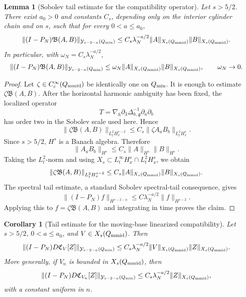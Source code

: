 \documentclass[11pt]{article}
\numberwithin{equation}{section}
\theoremstyle{plain}
\newtheorem{lemma}{Lemma}[section]
\newtheorem{corollary}{Corollary}[section]
\theoremstyle{definition}
\theoremstyle{remark}
\newcommand{\nabh}{\nabla_h}
\newcommand{\calB}{\mathfrak B}
\newcommand{\calC}{\mathfrak C}
\newcommand{\calY}{\mathcal Y}
\begin{document}
\begin{lemma}[Sobolev tail estimate for the compatibility operator]
\label{pIII:lem:sobolev-tail-compatibility}
Let \(s>5/2\).  There exist \(a_0>0\) and constants \(C_s\), depending only on the interior cylinder
chain and on \(s\), such that for every \(0<a\le a_0\),
\[
        \|(I-P_N)\calB(A,B)\|_{\calY_{s-2-a}(Q_{\rm min})}
        \le
        C_s\lambda_N^{-a/2}
        \|A\|_{X_s(Q_{\rm mmid})}\|B\|_{X_s(Q_{\rm mmid})}.
\]
In particular, with \(\omega_N=C_s\lambda_N^{-a/2}\),
\[
        \|(I-P_N)\calB(A,B)\|_{\calY_{s-2-a}(Q_{\rm min})}
        \le
        \omega_N\|A\|_{X_s(Q_{\rm mmid})}\|B\|_{X_s(Q_{\rm mmid})},
        \qquad
        \omega_N\to0.
\]
\end{lemma}

\begin{proof}
Let \(\zeta\in C_c^\infty(Q_{\rm mmid})\) be identically one on \(Q_{\rm min}\).  It is enough to
estimate \(\zeta\calB(A,B)\).  After the horizontal harmonic ambiguity has been fixed, the localized
operator
\[
        T=\nabh\partial_3\Delta_{h,\mathfrak g}^{-1}\partial_a\partial_b
\]
has order two in the Sobolev scale used here.  Hence
\[
        \|\zeta\calB(A,B)\|_{L^2_tH^{s-2}_x}
        \le
        C_s\|\zeta A_aB_b\|_{L^2_tH^s_x}.
\]
Since \(s>5/2\), \(H^s\) is a Banach algebra.  Therefore
\[
        \|A_aB_b\|_{H^s}\le C_s\|A\|_{H^s}\|B\|_{H^s}.
\]
Taking the \(L^2_t\)-norm and using \(X_s\subset L^\infty_tH^s_x\cap L^2_tH^s_x\), we obtain
\[
        \|\zeta\calB(A,B)\|_{L^2_tH^{s-2}_x}
        \le
        C_s\|A\|_{X_s(Q_{\rm mmid})}\|B\|_{X_s(Q_{\rm mmid})}.
\]
The spectral tail estimate, a standard Sobolev spectral-tail consequence, gives
\[
        \|(I-P_N)f\|_{H^{s-2-a}}
        \le C\lambda_N^{-a/2}\|f\|_{H^{s-2}}.
\]
Applying this to \(f=\zeta\calB(A,B)\) and integrating in time proves the claim.
\end{proof}

\begin{corollary}[Tail estimate for the moving-base linearized compatibility]
\label{pIII:cor:tail-linearized-compatibility}
Let \(s>5/2\), \(0<a\le a_0\), and \(V\in X_s(Q_{\rm mmid})\).  Then
\[
        \|(I-P_N)D\calC_V[Z]\|_{\calY_{s-2-a}(Q_{\rm min})}
        \le
        C_s\lambda_N^{-a/2}
        \|V\|_{X_s(Q_{\rm mmid})}\|Z\|_{X_s(Q_{\rm mmid})}.
\]
More generally, if \(V_n\) is bounded in \(X_s(Q_{\rm mmid})\), then
\[
        \|(I-P_N)D\calC_{V_n}[Z]\|_{\calY_{s-2-a}(Q_{\rm min})}
        \le
        C_s\lambda_N^{-a/2}\|Z\|_{X_s(Q_{\rm mmid})},
\]
with a constant uniform in \(n\).
\end{corollary}
\end{document}
